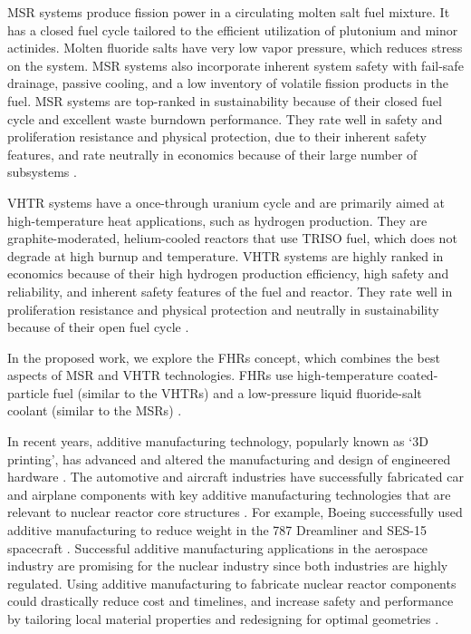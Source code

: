 \gls{MSR} systems produce fission power in a circulating molten salt fuel mixture. 
It has a closed fuel cycle tailored to the efficient utilization of plutonium 
and minor actinides. 
Molten fluoride salts have very low vapor pressure, which reduces stress on the 
system. 
MSR systems also incorporate inherent system safety with fail-safe drainage, 
passive cooling, and a low inventory of volatile fission products in the fuel. 
MSR systems are top-ranked in sustainability because of their closed fuel cycle 
and excellent waste burndown performance. 
They rate well in safety and proliferation resistance and physical protection, 
due to their inherent safety features, and rate neutrally in economics because of
their large number of subsystems \cite{gif_technology_2002}.  

\gls{VHTR} systems have a once-through uranium cycle and are primarily aimed at 
high-temperature heat applications, such as hydrogen production. 
They are graphite-moderated, helium-cooled reactors that use \gls{TRISO} fuel, 
which does not degrade at high burnup and temperature.  
\gls{VHTR} systems are highly ranked in economics because of their high hydrogen 
production efficiency, high safety and reliability, and inherent safety features 
of the fuel and reactor. 
They rate well in proliferation resistance and physical protection and 
neutrally in sustainability because of their open fuel cycle \cite{gif_technology_2002}. 

In the proposed work, we explore the \glspl{FHR} concept, which 
combines the best aspects of \gls{MSR} and \gls{VHTR} technologies. 
\glspl{FHR} use high-temperature coated-particle fuel (similar to the \glspl{VHTR}) 
and a low-pressure liquid fluoride-salt coolant (similar to the \glspl{MSR})
\cite{forsberg_fluoride-salt-cooled_2012,facilitators_fluoride-salt-cooled_2013}.

In recent years, additive manufacturing technology, popularly known as `3D printing', 
has advanced and altered the manufacturing and design of engineered hardware
\cite{simpson_considerations_2019}. 
The automotive and aircraft industries have successfully fabricated car and 
airplane components with key additive manufacturing technologies that are 
relevant to nuclear reactor core structures \cite{murr_frontiers_2016}.  
For example, Boeing successfully used additive manufacturing to reduce weight 
in the 787 Dreamliner \cite{noauthor_printed_2017} and SES-15 spacecraft 
\cite{noauthor_boeing_nodate}. 
Successful additive manufacturing applications in the aerospace industry are 
promising for the nuclear industry since both industries are highly regulated. 
Using additive manufacturing to fabricate nuclear reactor components could 
drastically reduce cost and timelines, and increase safety and performance by 
tailoring local material properties and redesigning for optimal geometries
\cite{simpson_considerations_2019}. 

